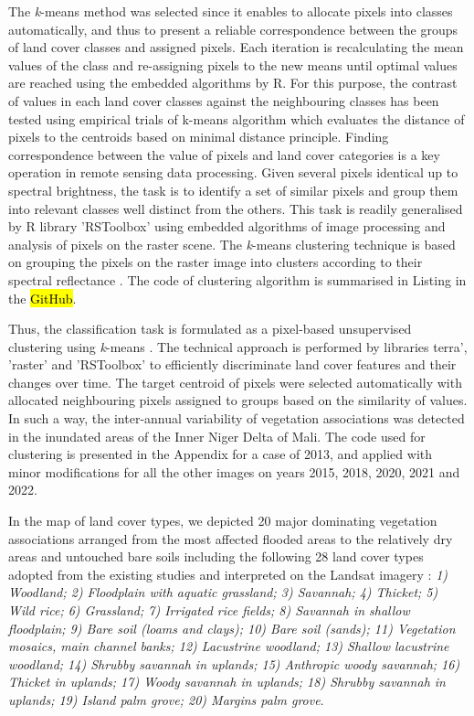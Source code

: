 \documentclass[12pt,a4paper,oneside]{article}
\def \newpar{\vspace{6pt}}
\begin{document}
\newpar The \emph{k}-means method was selected since it enables to allocate pixels into classes automatically, and thus to present a reliable correspondence between the groups of land cover classes and assigned pixels. Each iteration is recalculating the mean values of the class and re-assigning pixels to the new means until optimal values are reached using the embedded algorithms by R. For this purpose, the contrast of values in each land cover classes against the neighbouring classes has been tested using empirical trials of k-means algorithm which evaluates the distance of pixels to the centroids based on minimal distance principle. Finding correspondence between the value of pixels and land cover categories is a key operation in remote sensing data processing. Given several pixels identical up to spectral brightness, the task is to identify a set of similar pixels and group them into relevant classes well distinct from the others. This task is readily generalised by R library 'RSToolbox' using embedded algorithms of image processing and analysis of pixels on the raster scene. The \emph{k}-means clustering technique is based on grouping the pixels on the raster image into clusters according to their spectral reflectance \citep{Richards2022,OSE201657}. The code of clustering algorithm is summarised in Listing\hl{ }in the \hl{GitHub}.

\newpar Thus, the classification task is formulated as a pixel-based unsupervised clustering using \emph{k}-means \citep{Sreevalsan}. The technical approach is performed by libraries terra', 'raster' and 'RSToolbox' to efficiently discriminate land cover features and their changes over time. The target centroid of pixels were selected automatically with allocated neighbouring pixels assigned to groups based on the similarity of values. In such a way, the inter-annual variability of vegetation associations was detected in the inundated areas of the Inner Niger Delta of Mali. The code used for clustering is presented in the Appendix for a case of 2013, and applied with minor modifications for all the other images on years 2015, 2018, 2020, 2021 and 2022.

\newpar In the map of land cover types, we depicted 20 major dominating vegetation associations arranged from the most affected flooded areas to the relatively dry areas and untouched bare soils including the following 28 land cover types adopted from the existing studies and interpreted on the Landsat imagery \cite{Marie}: \emph{1) Woodland; 2) Floodplain with aquatic grassland; 3) Savannah; 4) Thicket; 5) Wild rice; 6) Grassland; 7) Irrigated rice fields; 8) Savannah in shallow floodplain; 9) Bare soil (loams and clays); 10) Bare soil (sands); 11) Vegetation mosaics, main channel banks; 12) Lacustrine woodland; 13) Shallow lacustrine woodland; 14) Shrubby savannah in uplands; 15) Anthropic woody savannah; 16) Thicket in uplands; 17) Woody savannah in uplands; 18) Shrubby savannah in uplands; 19) Island palm grove; 20) Margins palm grove}.
\end{document}

